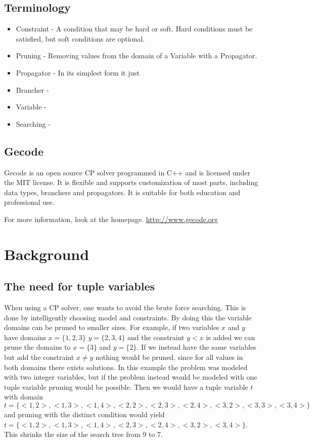 \documentclass[a4paper,11pt]{article}
\begin{document}
\subsection{Terminology}
\begin{itemize}
\item{Constraint - A condition that may be hard or soft. Hard conditions must be satisfied, but soft conditions are optional.}
\item{Pruning} - Removing values from the domain of a Variable with a Propagator.
\item{Propagator} - In its simplest form it just
\item{Brancher} -
\item{Variable} -
\item{Searching} - 
\end{itemize}

\subsection{Gecode}
Gecode is an open source CP solver programmed in C++ and is licensed under the MIT license. It is flexible and supports customization of most parts, including data types, branchers and propagators. It is suitable for both education and professional use.

For more information, look at the homepage. \url{http://www.gecode.org}

\section{Background}
\subsection{The need for tuple variables}
When using a CP solver, one wants to avoid the brute force searching. This is done by intelligently choosing model and constraints. By doing this the variable domains can be pruned to smaller sizes. For example, if two variables $x$ and $y$ have domains $x=\{1,2,3\}$ $y=\{2,3,4\}$ and the constraint $y<x$ is added we can prune the domains to $x=\{3\}$ and $y=\{2\}$. If we instead have the same variables but add the constraint $x\neq y$ nothing would be pruned, since for all values in both domains there exists solutions. In this example the problem was modeled with two integer variables, but if the problem instead would be modeled with one tuple variable pruning would be possible. Then we would have a tuple variable $t$ with domain $t=\{<1,2>,<1,3>,<1,4>,<2,2>,<2,3>,<2,4>,<3,2>,<3,3>,<3,4>\}$ and pruning with the distinct condition would yield $t=\{<1,2>,<1,3>,<1,4>,<2,3>,<2,4>,<3,2>,<3,4>\}$. This shrinks the size of the search tree from 9 to 7. 
\end{document}
